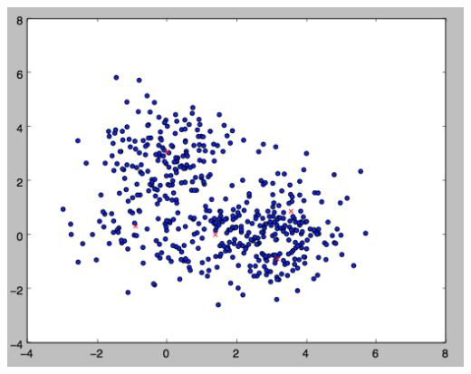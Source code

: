 \documentclass[11pt]{article}
\begin{document}
\includegraphics[scale=.6]{images/k5}
\end{document}
